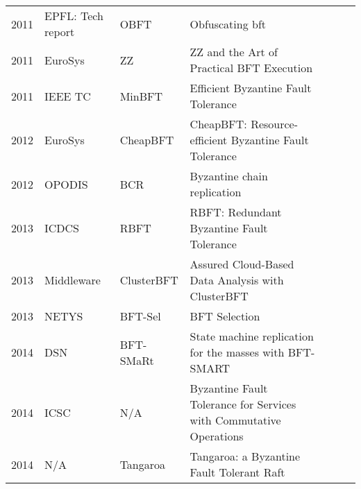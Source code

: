 \documentclass{article}
\begin{document}
\begin{landscape}
\begin{table}[]
{\begin{tabular}{llll|l|l|l|}
2011 & EPFL: Tech report & OBFT                    & Obfuscating bft                                                                           &            &          &              \\ \cline{5-7} 
2011 & EuroSys           & ZZ                      & ZZ and the Art of Practical BFT Execution                                                 &            &          &              \\ \cline{5-7} 
2011 & IEEE TC           & MinBFT                  & Efficient Byzantine Fault Tolerance                                                       &            &          &              \\ \cline{5-7} 
2012 & EuroSys           & CheapBFT                & CheapBFT: Resource-efficient Byzantine Fault Tolerance                                    &            &          &              \\ \cline{5-7} 
2012 & OPODIS            & BCR                     & Byzantine chain replication                                                               &            &          &              \\ \cline{5-7} 
2013 & ICDCS             & RBFT                    & RBFT: Redundant Byzantine Fault Tolerance                                                 &            &          &              \\ \cline{5-7} 
2013 & Middleware        & ClusterBFT              & Assured Cloud-Based Data Analysis with ClusterBFT                                         &            &          &              \\ \cline{5-7} 
2013 & NETYS             & BFT-Sel                 & BFT Selection                                                                             &            &          &              \\ \cline{5-7} 
2014 & DSN               & BFT-SMaRt               & State machine replication for the masses with BFT-SMART                                   &            &          &              \\ \cline{5-7} 
2014 & ICSC              & N/A                     & Byzantine Fault Tolerance for Services with Commutative Operations                        &            &          &              \\ \cline{5-7} 
2014 & N/A               & Tangaroa                & Tangaroa: a Byzantine Fault Tolerant Raft                                                 &            &          &              \\ \cline{5-7} 

\end{tabular}}
\end{table}
\end{landscape}
\end{document}
